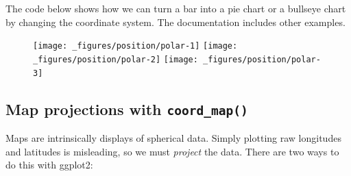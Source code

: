 The code below shows how we can turn a bar into a pie chart or a
bullseye chart by changing the coordinate system. The documentation
includes other examples. 
 

\begin{Shaded}
\begin{Highlighting}[]
\StringTok{ }\NormalTok{(}\NormalTok{(}\NormalTok{), } 
\StringTok{  }\NormalTok{(} \NormalTok{) +}\StringTok{ }
\StringTok{  }\NormalTok{(} \NormalTok{) +}\StringTok{ }
\StringTok{  }\NormalTok{(}\NormalTok{, } \NormalTok{(}\NormalTok{, }\NormalTok{)) +}
\StringTok{  }\NormalTok{(}\NormalTok{, } \NormalTok{(}\NormalTok{, }\NormalTok{))}


\StringTok{ }\NormalTok{(} \NormalTok{)}

\StringTok{ }\NormalTok{()}
\end{Highlighting}
\end{Shaded}

\begin{figure}[H]
  \texttt{[image: \_figures/position/polar-1]}%
  \texttt{[image: \_figures/position/polar-2]}%
  \texttt{[image: \_figures/position/polar-3]}
\end{figure}

\subsection{\texorpdfstring{Map projections with
\texttt{coord\_map()}}{Map projections with coord\_map()}}

Maps are intrinsically displays of spherical data. Simply plotting raw
longitudes and latitudes is misleading, so we must \emph{project} the
data. There are two ways to do this with ggplot2:
 
  

